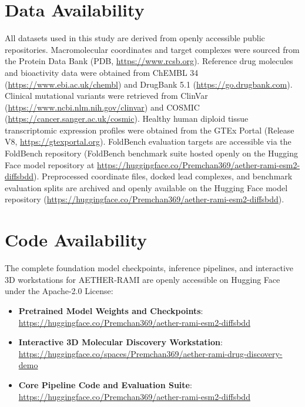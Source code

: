 \documentclass[11pt,a4paper]{article}
\begin{document}
\section*{Data Availability}
All datasets used in this study are derived from openly accessible public repositories. Macromolecular coordinates and target complexes were sourced from the Protein Data Bank (PDB, \url{https://www.rcsb.org}). Reference drug molecules and bioactivity data were obtained from ChEMBL 34 (\url{https://www.ebi.ac.uk/chembl}) and DrugBank 5.1 (\url{https://go.drugbank.com}). Clinical mutational variants were retrieved from ClinVar (\url{https://www.ncbi.nlm.nih.gov/clinvar}) and COSMIC (\url{https://cancer.sanger.ac.uk/cosmic}). Healthy human diploid tissue transcriptomic expression profiles were obtained from the GTEx Portal (Release V8, \url{https://gtexportal.org}). FoldBench evaluation targets are accessible via the FoldBench repository (FoldBench benchmark suite hosted openly on the Hugging Face model repository at \url{https://huggingface.co/Premchan369/aether-rami-esm2-diffsbdd}). Preprocessed coordinate files, docked lead complexes, and benchmark evaluation splits are archived and openly available on the Hugging Face model repository (\url{https://huggingface.co/Premchan369/aether-rami-esm2-diffsbdd}).

\section*{Code Availability}
The complete foundation model checkpoints, inference pipelines, and interactive 3D workstations for AETHER-RAMI are openly accessible on Hugging Face under the Apache-2.0 License:
\begin{itemize}\setlength{\itemsep}{0.5em}
    \item \textbf{Pretrained Model Weights and Checkpoints}:\\
    \url{https://huggingface.co/Premchan369/aether-rami-esm2-diffsbdd}
    \item \textbf{Interactive 3D Molecular Discovery Workstation}:\\
    \url{https://huggingface.co/spaces/Premchan369/aether-rami-drug-discovery-demo}
    \item \textbf{Core Pipeline Code and Evaluation Suite}:\\
    \url{https://huggingface.co/Premchan369/aether-rami-esm2-diffsbdd}
\end{itemize}
\end{document}
